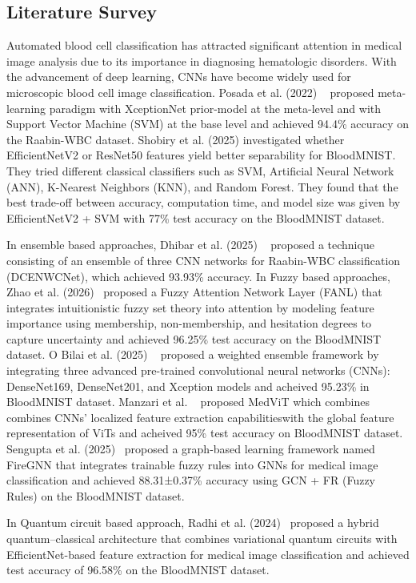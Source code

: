 \documentclass[12pt]{article}
\begin{document}
\subsection{Literature Survey}

Automated blood cell classification has attracted significant attention in medical image analysis due to its importance in diagnosing hematologic disorders. With the advancement of deep learning, CNNs have become widely used for microscopic blood cell image classification. Posada et al. (2022) ~\cite{b43} proposed meta-learning paradigm with XceptionNet prior-model at the meta-level and with Support Vector Machine (SVM) at the base level and achieved 94.4\% accuracy on the Raabin-WBC dataset. Shobiry et al. (2025) \cite{b17} investigated whether EfficientNetV2 or ResNet50 features yield better separability for BloodMNIST. They tried different classical classifiers such as SVM, Artificial Neural Network (ANN), K-Nearest Neighbors (KNN), and Random Forest. They found that the best trade-off between accuracy, computation time, and model size was given by EfficientNetV2 + SVM with 77\% test accuracy on the BloodMNIST dataset.

In ensemble based approaches, Dhibar et al. (2025) ~\cite{b41} proposed a technique consisting of an ensemble of three CNN networks for Raabin-WBC classification (DCENWCNet), which achieved  93.93\% accuracy. In Fuzzy based approaches, Zhao et al. (2026)~\cite{b38} proposed a Fuzzy Attention Network Layer (FANL) that integrates intuitionistic fuzzy set theory into attention by modeling feature importance using membership, non-membership, and hesitation degrees to capture uncertainty and achieved 96.25\% test accuracy on the BloodMNIST dataset. O Bilai et al. (2025) ~\cite{b45} proposed a weighted ensemble framework by integrating three advanced pre-trained convolutional neural networks (CNNs): DenseNet169, DenseNet201, and Xception models and acheived 95.23\% in BloodMNIST dataset. Manzari et al. ~\cite{b46} proposed MedViT which combines combines CNNs’ localized feature extraction capabilitieswith the global feature representation of ViTs and acheived 95\% test accuracy on BloodMNIST dataset. Sengupta et al. (2025)~\cite{b39} proposed  a graph-based learning framework named FireGNN that integrates trainable fuzzy rules into GNNs for medical image classification and achieved 88.31±0.37\% accuracy using GCN + FR (Fuzzy Rules) on the BloodMNIST dataset.

In Quantum circuit based approach, Radhi et al. (2024)~\cite{b16} proposed a hybrid quantum–classical architecture that combines variational quantum circuits with EfficientNet-based feature extraction for medical image classification and achieved test accuracy of 96.58\% on the BloodMNIST dataset.
\end{document}
